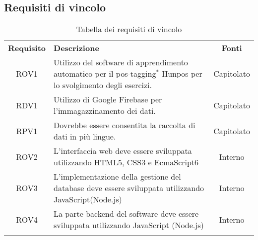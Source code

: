 \subsection{Requisiti di vincolo}
\begin{longtable}{| c | p{10cm} | c |}
		\rowcolor{LightBlue}
		\color{white}\bfseries Requisito & \color{white}\bfseries Descrizione & \color{white}\bfseries Fonti\\[0.25cm]
		ROV1 & Utilizzo del software di apprendimento automatico per il pos-tagging$^*$ Hunpos per lo svolgimento degli esercizi. & Capitolato \\
		RDV1 & Utilizzo di Google Firebase per l'immagazzinamento dei dati. & Capitolato \\
		RPV1 & Dovrebbe essere consentita la raccolta di dati in più lingue. & Capitolato \\
		ROV2 & L’interfaccia web deve essere sviluppata utilizzando HTML5, CSS3 e EcmaScript6 & Interno\\
		ROV3 & L'implementazione della gestione del database deve essere sviluppata utilizzando JavaScript(Node.js) & Interno\\
		ROV4 & La parte backend del software deve essere sviluppata utilizzando JavaScript (Node.js) & Interno\\
		\hline
		\caption{Tabella dei requisiti di vincolo}
\end{longtable}

